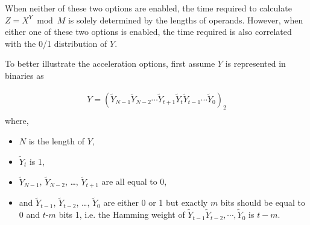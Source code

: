 \documentclass[main\_\_EN.tex]{subfiles}
\begin{document}
When neither of these two options are enabled, the time required to calculate \begin{math}Z = X^{Y} \bmod M\end{math} is solely determined by the lengths of operands. However, when either one of these two options is enabled, the time required is also correlated with the 0/1 distribution of \begin{math}Y\end{math}.

To better illustrate the acceleration options, first assume \begin{math}Y \end{math} is represented in binaries as

\begin{gather*}
Y = ( \widetilde{Y}_{N-1} \widetilde{Y}_{N-2} \cdots \widetilde{Y}_{t+1} \widetilde{Y}_{t} \widetilde{Y}_{t-1} \cdots \widetilde{Y}_{0} )_{2} \\
\end{gather*}
where,
\begin{itemize}
    \item \begin{math} N \end{math} is the length of \begin{math}Y \end{math},
    \item \begin{math}\widetilde{Y}_{t}\end{math} is 1,
    \item \begin{math}\widetilde{Y}_{N-1}\end{math}, \begin{math}\widetilde{Y}_{N-2}\end{math}, \dots, \begin{math}\widetilde{Y}_{t+1}\end{math} are all equal to 0,
    \item and \begin{math}\widetilde{Y}_{t-1}\end{math}, \begin{math}\widetilde{Y}_{t-2}\end{math}, \dots, \begin{math}\widetilde{Y}_{0}\end{math} are either 0 or 1 but exactly \begin{math}m\end{math} bits should be equal to 0 and \begin{math}t\end{math}-\begin{math}m\end{math} bits 1, i.e. the Hamming weight of \begin{math}\widetilde{Y}_{t-1} \widetilde{Y}_{t-2}, \cdots, \widetilde{Y}_{0}\end{math} is \begin{math}t -m\end{math}.
\end{itemize}
\end{document}
